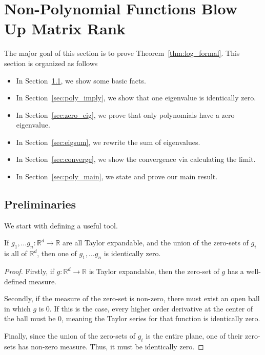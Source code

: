 \section{Non-Polynomial Functions Blow Up Matrix Rank}\label{sec:non_polynoimial}

The major goal of this section is to prove Theorem~\ref{thm:log_formal}. This section is organized as follows
\begin{itemize}
    \item In Section~\ref{sec:poly_preli}, we show some basic facts.
    \item In Section~\ref{sec:poly_imply}, we show that one eigenvalue is identically zero.
    \item In Section~\ref{sec:zero_eig}, we prove that only polynomials have a zero eigenvalue.
    \item In Section~\ref{sec:eigsum}, we rewrite the sum of eigenvalues.
    \item In Section~\ref{sec:converge}, we show the convergence via calculating the limit.
    \item In Section~\ref{sec:poly_main}, we state and prove our main result.
\end{itemize}


\subsection{Preliminaries}\label{sec:poly_preli}


We start with defining a useful tool.
\begin{lemma}\label{lem:zeroset}
If $g_1, \ldots g_n: \mathbb{R}^d \rightarrow \mathbb{R}$ are all Taylor expandable, and the union of the zero-sets of $g_i$ is all of $\mathbb{R}^d$, then one of $g_1, \ldots g_n$ is identically zero.
\end{lemma}
\begin{proof}

Firstly, if $g:\mathbb{R}^d \rightarrow \mathbb{R}$ is Taylor expandable, then the zero-set of $g$ has a well-defined measure.  

Secondly, if the measure of the zero-set is non-zero, there must exist an open ball in which $g$ is $0$. If this is the case, every higher order derivative at the center of the ball must be $0$, meaning the Taylor series for that function is identically zero.  


Finally, since the union of the zero-sets of $g_i$ is the entire plane, one of their zero-sets has non-zero measure. Thus,  
it must be identically zero. 
\end{proof}


